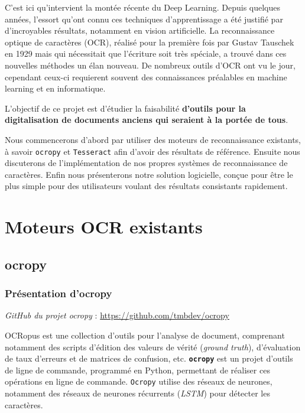 \documentclass{report}
\begin{document}
C'est ici qu'intervient la montée récente du Deep Learning.
Depuis quelques années, l'essort qu'ont connu ces techniques d'apprentissage a été justifié par d'incroyables résultats, notamment en vision artificielle.
La reconnaissance optique de caractères (OCR), réalisé pour la première fois par Gustav Tauschek en 1929 mais qui nécessitait que l'écriture soit très spéciale, a trouvé dans ces nouvelles méthodes un élan nouveau.
De nombreux outils d'OCR ont vu le jour, cependant ceux-ci requierent souvent des connaissances préalables en machine learning et en informatique.

L'objectif de ce projet est d'étudier la faisabilité \textbf{d'outils pour la digitalisation de documents anciens qui seraient à la portée de tous}.

Nous commencerons d'abord par utiliser des moteurs de reconnaissance existants, à savoir \texttt{ocropy} et \texttt{Tesseract} afin d'avoir des résultats de référence.
Ensuite nous discuterons de l'implémentation de nos propres systèmes de reconnaissance de caractères.
Enfin nous présenterons notre solution logicielle, conçue pour être le plus simple pour des utilisateurs voulant des résultats consistants rapidement.

\newpage 
\tableofcontents
\newpage 

\chapter{Moteurs OCR existants}

\section{ocropy}

\subsection{Présentation d'ocropy}

\textit{GitHub du projet ocropy} : \href{https://github.com/tmbdev/ocropy}{https://github.com/tmbdev/ocropy}

OCRopus est une collection d'outils pour l'analyse de document, comprenant notamment des scripts d'édition des valeurs de vérité (\textit{ground truth}), d'évaluation de taux d'erreurs et de matrices de confusion, etc.
\textbf{\texttt{ocropy}} est un projet d'outils de ligne de commande, programmé en Python, permettant de réaliser ces opérations en ligne de commande. \texttt{Ocropy} utilise des réseaux de neurones, notamment des réseaux de neurones récurrents (\textit{LSTM}) pour détecter les caractères.
\end{document}

